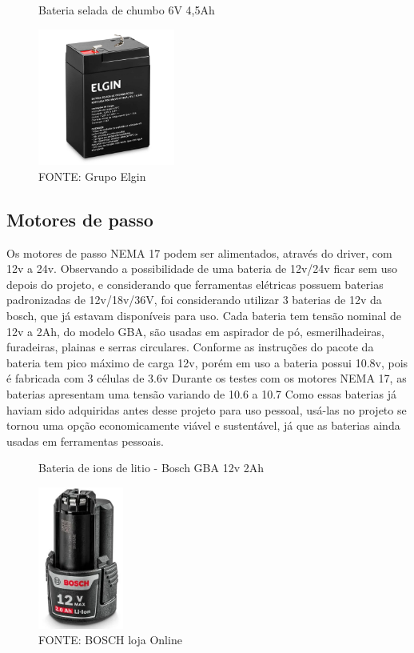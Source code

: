 \begin{figure}[ht]
	\centering
	\caption{Bateria selada de chumbo 6V 4,5Ah}
	\includegraphics[width=0.4\textwidth]{figures/bateria_6v}
    \caption*{FONTE: Grupo Elgin}
	\label{bateria_6v}
\end{figure}

\subsection{Motores de passo}

Os motores de passo NEMA 17 podem ser alimentados, através do driver, com 12v a 24v.
Observando a possibilidade de uma bateria de 12v/24v ficar sem uso depois do projeto,
e considerando que ferramentas elétricas possuem baterias padronizadas de 12v/18v/36V, 
foi considerando utilizar 3 baterias de 12v da bosch, que já estavam disponíveis para uso.
Cada bateria tem tensão nominal de 12v a 2Ah, do modelo GBA, 
são usadas em aspirador de pó, esmerilhadeiras, furadeiras, plainas e serras circulares.
Conforme as instruções do pacote da bateria tem pico máximo de carga 12v, porém em uso a bateria possui 10.8v,
pois é fabricada com 3 células de 3.6v
Durante os testes com os motores NEMA 17,  as baterias apresentam uma tensão variando de 10.6 a 10.7
Como essas baterias já haviam sido adquiridas antes desse projeto para uso pessoal,
usá-las no projeto se tornou uma opção economicamente viável e sustentável,
já que as baterias ainda usadas em ferramentas pessoais.

\begin{figure}[ht]
	\centering
	\caption{Bateria de ions de litio - Bosch GBA 12v 2Ah}
	\includegraphics[width=0.25\textwidth]{figures/gba_bosch_bateria}
    \caption*{FONTE: BOSCH loja Online}
	\label{gba_bosch_bateria}
\end{figure}


